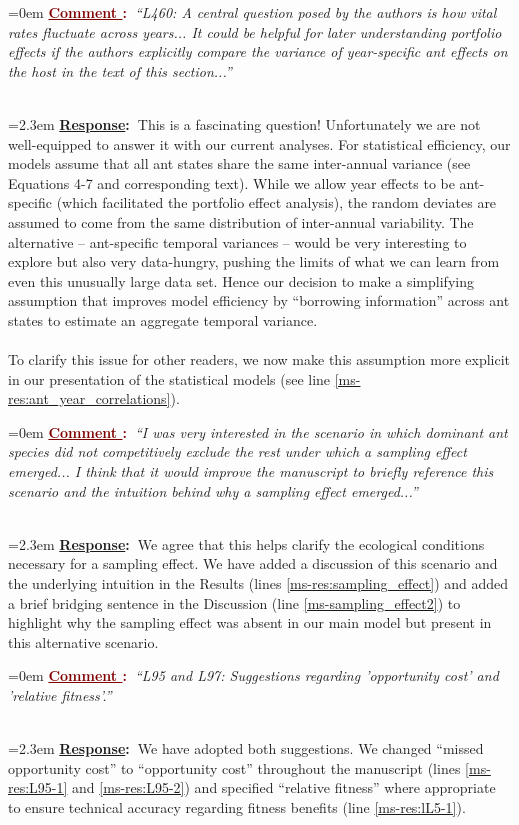 \documentclass[12pt]{article}
\newcounter{cN}
\newcommand{\comment}[1]{
	\vspace{2em}
	\refstepcounter{cN} %
	\noindent \hangindent=0em \textbf{\textcolor{Maroon}{\uline{Comment \thecN}:~}}\emph{``#1''}
}
\newcommand{\response}[1]{
	\\[0.25em]
	\hangindent=2.3em \textbf{\textcolor{NavyBlue}{\uline{Response}:~}}#1
}
\begin{document}
	\comment{L460: A central question posed by the authors is how vital rates fluctuate across years... It could be helpful for later understanding portfolio effects if the authors explicitly compare the variance of year-specific ant effects on the host in the text of this section...}
	\response{This is a fascinating question! Unfortunately we are not well-equipped to answer it with our current analyses. For statistical efficiency, our models assume that all ant states share the same inter-annual variance (see Equations 4-7 and corresponding text). While we allow year effects to be ant-specific (which facilitated the portfolio effect analysis), the random deviates are assumed to come from the same distribution of inter-annual variability. The alternative -- ant-specific temporal variances -- would be very interesting to explore but also very data-hungry, pushing the limits of what we can learn from even this unusually large data set. Hence our decision to make a simplifying assumption that improves model efficiency by ``borrowing information'' across ant states to estimate an aggregate temporal variance. 
	\\
	\\
	To clarify this issue for other readers, we now make this assumption more explicit in our presentation of the statistical models (see line \ref{ms-res:ant_year_correlations}).}
	
	\comment{I was very interested in the scenario in which dominant ant species did not competitively exclude the rest under which a sampling effect emerged... I think that it would improve the manuscript to briefly reference this scenario and the intuition behind why a sampling effect emerged...}
	\response{We agree that this helps clarify the ecological conditions necessary for a sampling effect. We have added a discussion of this scenario and the underlying intuition in the Results (lines \ref{ms-res:sampling_effect}) and added a brief bridging sentence in the Discussion (line \ref{ms-sampling_effect2}) to highlight why the sampling effect was absent in our main model but present in this alternative scenario.}
	
	\comment{L95 and L97: Suggestions regarding 'opportunity cost' and 'relative fitness'.}
	\response{We have adopted both suggestions. We changed ``missed opportunity cost'' to ``opportunity cost'' throughout the manuscript (lines \ref{ms-res:L95-1} and \ref{ms-res:L95-2}) and specified ``relative fitness'' where appropriate to ensure technical accuracy regarding fitness benefits (line \ref{ms-res:lL5-1}).}
	
\end{document}
